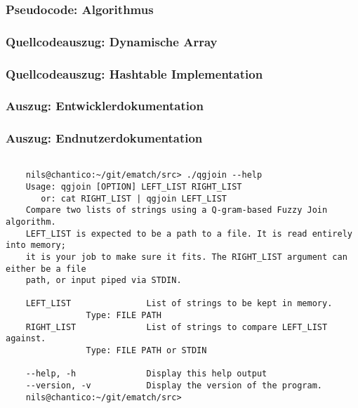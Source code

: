 \subsubsection{Pseudocode: Algorithmus}
\begin{figure}[!htp]
	
	\centering
\end{figure}

\subsubsection{Quellcodeauszug: Dynamische Array}


\subsubsection{Quellcodeauszug: Hashtable Implementation}


\subsubsection{Auszug: Entwicklerdokumentation}


\subsubsection{Auszug: Endnutzerdokumentation}
\begin{lstlisting}[style=xterm, caption=Ausgabe der Endnutzerdokumentation über den --help parameter, label=fig:cliHelp,]

	nils@chantico:~/git/ematch/src> ./qgjoin --help
	Usage: qgjoin [OPTION] LEFT_LIST RIGHT_LIST
	   or: cat RIGHT_LIST | qgjoin LEFT_LIST
	Compare two lists of strings using a Q-gram-based Fuzzy Join algorithm.
	LEFT_LIST is expected to be a path to a file. It is read entirely into memory;
	it is your job to make sure it fits. The RIGHT_LIST argument can either be a file
	path, or input piped via STDIN.
	
	LEFT_LIST               List of strings to be kept in memory.
				Type: FILE PATH
	RIGHT_LIST              List of strings to compare LEFT_LIST against.
				Type: FILE PATH or STDIN
	
	--help, -h              Display this help output
	--version, -v           Display the version of the program.
	nils@chantico:~/git/ematch/src>

\end{lstlisting}


